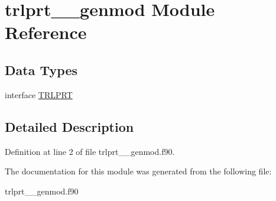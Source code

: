 \hypertarget{classtrlprt____genmod}{\section{trlprt\+\_\+\+\_\+genmod Module Reference}
\label{classtrlprt____genmod}
}
\subsection*{Data Types}
\begin{DoxyCompactItemize}
\item 
interface \hyperlink{interfacetrlprt____genmod_1_1_t_r_l_p_r_t}{T\+R\+L\+P\+R\+T}
\end{DoxyCompactItemize}


\subsection{Detailed Description}


Definition at line 2 of file trlprt\+\_\+\+\_\+genmod.\+f90.



The documentation for this module was generated from the following file\+:\begin{DoxyCompactItemize}
\item 
trlprt\+\_\+\+\_\+genmod.\+f90\end{DoxyCompactItemize}
